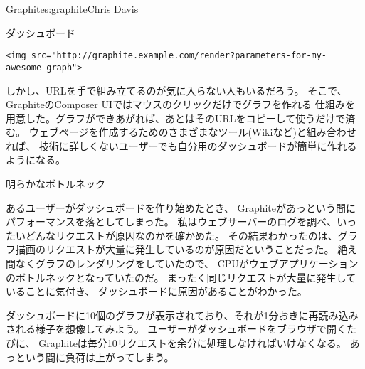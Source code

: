 \begin{aosachapter}{Graphite}{s:graphite}{Chris Davis}
\begin{aosasect1}{ダッシュボード}
\begin{verbatim}
<img src="http://graphite.example.com/render?parameters-for-my-awesome-graph">
\end{verbatim}

しかし、URLを手で組み立てるのが気に入らない人もいるだろう。
そこで、GraphiteのComposer UIではマウスのクリックだけでグラフを作れる
仕組みを用意した。グラフができあがれば、あとはそのURLをコピーして使うだけで済む。
ウェブページを作成するためのさまざまなツール(Wikiなど)と組み合わせれば、
技術に詳しくないユーザーでも自分用のダッシュボードが簡単に作れるようになる。

\end{aosasect1}

\begin{aosasect1}{明らかなボトルネック}

あるユーザーがダッシュボードを作り始めたとき、
Graphiteがあっという間にパフォーマンスを落としてしまった。
私はウェブサーバーのログを調べ、いったいどんなリクエストが原因なのかを確かめた。
その結果わかったのは、グラフ描画のリクエストが大量に発生しているのが原因だということだった。
絶え間なくグラフのレンダリングをしていたので、
CPUがウェブアプリケーションのボトルネックとなっていたのだ。
まったく同じリクエストが大量に発生していることに気付き、
ダッシュボードに原因があることがわかった。

ダッシュボードに10個のグラフが表示されており、それが1分おきに再読み込みされる様子を想像してみよう。
ユーザーがダッシュボードをブラウザで開くたびに、
Graphiteは毎分10リクエストを余分に処理しなければいけなくなる。
あっという間に負荷は上がってしまう。


\end{aosasect1}
\end{aosachapter}
